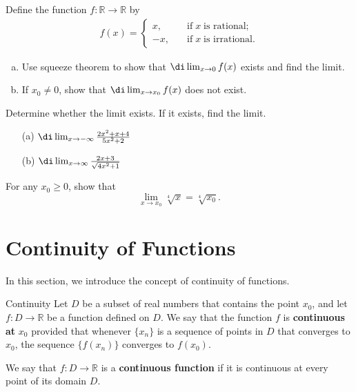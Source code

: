 \atc
\begin{question}{\themyquestion}
 Define the function $f:\mathbb{R}\rightarrow\mathbb{R}$   by
 \begin{align*}
 f(x)=\begin{cases}x,\quad & \text{if}\; x\;\text{is rational};
 \\-x,\quad & \text{if}\;x\;\text{is irrational}.\end{cases}
 \end{align*}
 \begin{enumerate}
 [(a)]
 \item Use squeeze theorem to show that  $\di\lim_{x\rightarrow 0}f(x)$ exists and find the limit.
 \item If $x_0\neq 0$, show that  $\di\lim_{x\rightarrow x_0}f(x)$ does not exist.
 \end{enumerate}
\end{question}

\atc

\begin{question}{\themyquestion}
Determine whether the limit exists. If it  exists, find the limit.
\begin{enumerate}[(a)]
\item[(a)]
$\di \lim_{x\rightarrow -\infty}\frac{2x^2+x+4}{5x^2+2}$
\item [(b)]$\di \lim_{x\rightarrow \infty}\frac{2x+3}{\sqrt{4x^2+1}}$
\end{enumerate}
\end{question}

\atc
\begin{question}{\themyquestion}
For any $x_0\geq 0$, show that
\[\lim_{x\rightarrow x_0}\sqrt[4]{x}=\sqrt[4]{x_0}.\]
\end{question}

\vp

\section{Continuity of Functions}\label{sec2.2}

In this section, we introduce the concept of continuity of functions.



\begin{definition}{Continuity}
Let $D$ be a subset of real numbers that contains the point $x_0$, and let $f:D\rightarrow\mathbb{R}$ be a function defined on $D$. We say that the function $f$ is {\bf continuous at } $x_0$ provided that whenever $\{x_n\}$ is a sequence of points in $D$ that converges to $x_0$, the sequence $\{f(x_n)\}$ converges to $f(x_0)$. 

We say that $f:D\rightarrow \mathbb{R}$ is a \textbf{continuous function} if it is continuous at every point of its domain $D$.
\end{definition}

